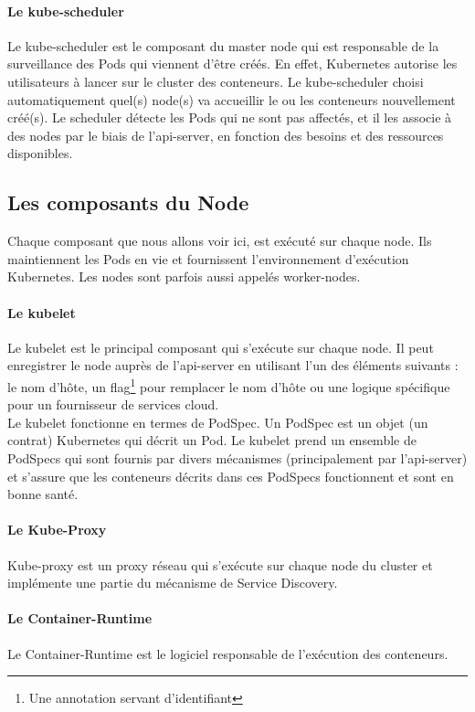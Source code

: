 \documentclass[11pt,fleqn]{book} %
\begin{document}
\paragraph*{Le kube-scheduler}
Le kube-scheduler est le composant du master node qui est responsable de la surveillance des Pods qui viennent d'être créés. En effet, Kubernetes autorise les utilisateurs à lancer sur le cluster des conteneurs. Le kube-scheduler choisi automatiquement quel(s) node(s) va accueillir le ou les conteneurs nouvellement créé(s). Le scheduler détecte les Pods qui ne sont pas affectés, et il les associe à des nodes par le biais de l'api-server, en fonction des besoins et des ressources disponibles.

\subsection*{Les composants du Node}
Chaque composant que nous allons voir ici, est exécuté sur chaque node. Ils maintiennent les Pods en vie et fournissent l'environnement d'exécution Kubernetes. Les nodes sont parfois aussi appelés worker-nodes.

\paragraph*{Le kubelet}
Le kubelet est le principal composant qui s'exécute sur chaque node. Il peut enregistrer le node auprès de l'api-server en utilisant l'un des éléments suivants : le nom d'hôte, un flag\footnote{Une annotation servant d'identifiant} pour remplacer le nom d'hôte ou une logique spécifique pour un fournisseur de services cloud.\\

Le kubelet fonctionne en termes de PodSpec. Un PodSpec est un objet (un contrat) Kubernetes qui décrit un Pod. Le kubelet prend un ensemble de PodSpecs qui sont fournis par divers mécanismes (principalement par l'api-server) et s'assure que les conteneurs décrits dans ces PodSpecs fonctionnent et sont en bonne santé.

\paragraph*{Le Kube-Proxy}
Kube-proxy est un proxy réseau qui s’exécute sur chaque node du cluster et implémente une partie du mécanisme de Service Discovery.

\paragraph*{Le Container-Runtime}
Le Container-Runtime est le logiciel responsable de l’exécution des conteneurs.\\
\end{document}
